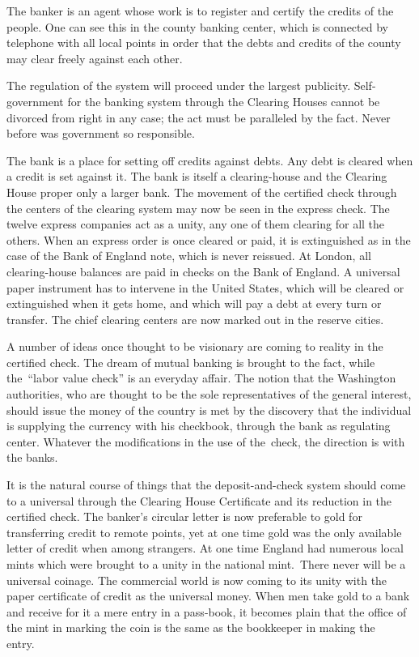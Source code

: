 \documentclass[twoside,symmetric,nobib,justified]{tufte-book}
\begin{document}
The banker is an agent whose work is to register and certify the credits
of the people. One can see this in the county banking center, which is
connected by telephone with all local points in order that the debts and
credits of the county may clear freely against each other.~

The regulation of the system will proceed under the largest publicity.
Self-government for the banking system through the Clearing Houses
cannot be divorced from right in any case; the act must be paralleled by
the fact. Never before was government so responsible.~~

The bank is a place for setting off credits against debts. Any debt is
cleared when a credit is set against it. The bank is itself a
clearing-house and the Clearing House proper only a larger bank. The
movement of the certified check through the centers of the clearing
system may now be seen in the express check. The twelve express
companies act as a unity, any one of them clearing for all the others.
When an express order is once cleared or paid, it is extinguished as in
the case of the Bank of England note, which is never reissued. At
London, all clearing-house balances are paid in checks on the Bank of
England. A universal paper instrument has to intervene in the United
States, which will be cleared or extinguished when it gets home, and
which will pay a debt at every turn or transfer. The chief clearing
centers are now marked out in the reserve cities.~

A number of ideas once thought to be visionary are coming to reality in
the certified check. The dream of mutual banking is brought to the fact,
while the~``labor value check'' is an everyday affair. The notion that
the Washington authorities, who are thought to be the sole
representatives of the general interest, should issue the money of the
country is met by the discovery that the individual is supplying the
currency with his checkbook, through the bank as regulating center.
Whatever the modifications in the use of the~check, the direction is
with the banks.~

It is the natural course of things that the deposit-and-check system
should come to a universal through the Clearing House Certificate and
its reduction in the certified check. The banker's circular letter is
now preferable to gold for transferring credit to remote points, yet at
one time gold was the only available letter of credit when among
strangers. At one time England had numerous local mints which were
brought to a unity in the national mint.~There never will be a universal
coinage. The commercial world is now coming to its unity with the paper
certificate of credit as the universal money. When men take gold to a
bank and receive for it a mere entry in a pass-book, it becomes plain
that the office of the mint in marking the coin is the same as the
bookkeeper in making the entry.~~
\end{document}
